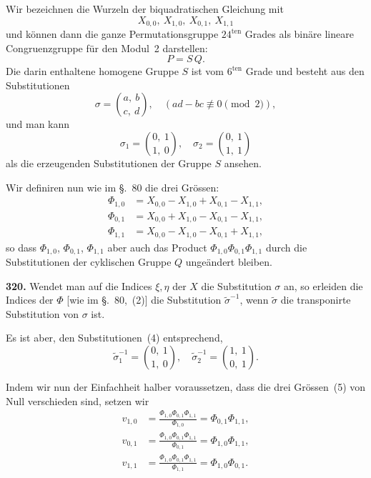 \documentclass[12pt,a4paper]{article}
\begin{document}
Wir bezeichnen die Wurzeln der biquadratischen Gleichung mit
\begin{equation}
\tag{1}
X_{0,0},\ X_{1,0},\ X_{0,1},\ X_{1,1}
\end{equation}
und k\"onnen dann die ganze Permutationsgruppe $24^{\text{ten}}$ Grades als bin\"are lineare Congruenzgruppe f\"ur den Modul~2 darstellen:
\begin{equation}
\tag{2}
P = S\,Q.
\end{equation}
Die darin enthaltene homogene Gruppe $S$ ist vom $6^{\text{ten}}$ Grade und besteht aus den Substitutionen
\[
\sigma = \binom{a,\ b}{c,\ d},\quad (ad-bc \not\equiv 0 \pmod 2),
\]
und man kann
\[
\sigma_1 = \binom{0,\ 1}{1,\ 0},\quad \sigma_2 = \binom{0,\ 1}{1,\ 1}
\]
als die erzeugenden Substitutionen der Gruppe $S$ ansehen.

Wir definiren nun wie im \S.~80 die drei Gr\"ossen:
\begin{equation}
\tag{3}
\begin{aligned}
\Phi_{1,0} &= X_{0,0} - X_{1,0} + X_{0,1} - X_{1,1},\\
\Phi_{0,1} &= X_{0,0} + X_{1,0} - X_{0,1} - X_{1,1},\\
\Phi_{1,1} &= X_{0,0} - X_{1,0} - X_{0,1} + X_{1,1},
\end{aligned}
\end{equation}
so dass $\Phi_{1,0}$, $\Phi_{0,1}$, $\Phi_{1,1}$ aber auch das Product $\Phi_{1,0}\Phi_{0,1}\Phi_{1,1}$ durch die Substitutionen der cyklischen Gruppe $Q$ unge\"andert bleiben.

\bigskip
\noindent\textbf{320.} Wendet man auf die Indices $\xi,\eta$ der $X$ die Substitution $\sigma$ an, so erleiden die Indices der $\Phi$ [wie im \S.~80,~(2)] die Substitution $\tilde\sigma^{-1}$, wenn $\tilde\sigma$ die transponirte Substitution von $\sigma$ ist.

Es ist aber, den Substitutionen~(4) entsprechend,
\[
\tilde\sigma_1^{-1} = \binom{0,\ 1}{1,\ 0},\quad
\tilde\sigma_2^{-1} = \binom{1,\ 1}{0,\ 1}.
\]

Indem wir nun der Einfachheit halber voraussetzen, dass die drei Gr\"ossen~(5) von Null verschieden sind, setzen wir
\begin{equation}
\tag{7}
\begin{aligned}
v_{1,0} &= \frac{\Phi_{1,0}\Phi_{0,1}\Phi_{1,1}}{\Phi_{1,0}} = \Phi_{0,1}\Phi_{1,1},\\
v_{0,1} &= \frac{\Phi_{1,0}\Phi_{0,1}\Phi_{1,1}}{\Phi_{0,1}} = \Phi_{1,0}\Phi_{1,1},\\
v_{1,1} &= \frac{\Phi_{1,0}\Phi_{0,1}\Phi_{1,1}}{\Phi_{1,1}} = \Phi_{1,0}\Phi_{0,1}.
\end{aligned}
\end{equation}
\end{document}
